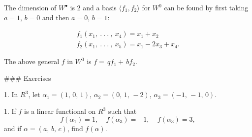 
The dimension of \(W^{\bullet}\) is 2 and a basis \(\langle f_{1},f_{2}\rangle\) for \(W^{0}\) can be found by first taking \(a=1\), \(b=0\) and then \(a=0\), \(b=1\):

\[\begin{array}{l}f_{1}(x_{1},\ .\ .\ .\ ,\ x_{4})=x_{1}+x_{2}\\ f_{2}(x_{1},\ .\ .\ .\ ,\ x_{5})=x_{1}-2x_{3}+x_{4}.\end{array}\]

The above general \(f\) in \(W^{0}\) is \(f=\,qf_{1}+\,bf_{2}\).

### Exercises

1. In \(R^{3}\), let \(\alpha_{1}=(1,\,0,\,1)\), \(\alpha_{2}=(0,\,1,\,-2)\), \(\alpha_{3}=(-1,\,-1,\,0)\).

1. If \(f\) is a linear functional on \(R^{3}\) such that \[f(\alpha_{1})=1,\ \ \ \ \ f(\alpha_{3})=-1,\ \ \ \ \ f(\alpha_{3})=3,\] and if \(\alpha=(a,\,b,\,c)\), find \(f(\alpha)\).

 